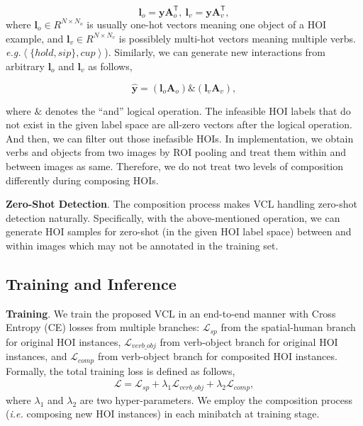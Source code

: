 \documentclass[runningheads]{llncs}
\newcommand{\ie}{\textit{i.e. }}
\newcommand{\eg}{\textit{e.g.}}
\begin{document}
\begin{equation}
\mathbf{l}_o = \mathbf{y} \mathbf{A}_o ^\mathsf{T} , ~ \mathbf{l}_v = \mathbf{y} \mathbf{A}_v ^\mathsf{T} ,
\end{equation}
where $\mathbf{l}_o \in R^{N \times N_o}$ is usually one-hot vectors meaning one object of a HOI example, and $\mathbf{l}_v \in R^{N \times N_v}$ is possiblely multi-hot vectors meaning multiple verbs. \eg $\left \langle \{hold, sip\}, cup \right \rangle$). Similarly, we can generate new interactions from arbitrary $\mathbf{l}_o$ and $\mathbf{l}_v$ as follows,

\begin{equation}
\label{formul:label}
\hat{\mathbf{y}} = (\mathbf{l}_o \mathbf{A}_o) \& (\mathbf{l}_v\mathbf{A}_v),
\end{equation}

where $\&$ denotes the ``and'' logical operation. The infeasible HOI labels that do not exist in the given label space are all-zero vectors after the logical operation. And then, we can filter out those inefasible HOIs. In implementation, we obtain verbs and objects from two images by ROI pooling and treat them within and between images as same. Therefore, we do not treat two levels of composition differently during composing HOIs.


\textbf{Zero-Shot Detection}. The composition process makes VCL handling zero-shot detection naturally. Specifically, with the above-mentioned operation, we can generate HOI samples for zero-shot (in the given HOI label space) between and within images which may not be annotated in the training set.


\subsection{Training and Inference}
\textbf{Training}. We train the proposed VCL in an end-to-end manner with Cross Entropy (CE) losses from multiple branches: $\mathcal{L}_{sp}$ from the spatial-human branch for original HOI instances, $\mathcal{L}_{verb\_obj}$ from verb-object branch for original HOI instances, and $\mathcal{L}_{comp}$ from verb-object branch for composited HOI instances. Formally, the total training loss is defined as follows,
\begin{align}
  \mathcal{L} = \mathcal{L}_{sp} + \lambda_1 \mathcal{L}_{verb\_obj} + \lambda_2 \mathcal{L}_{comp},
\end{align}
where $\lambda_1$ and $\lambda_2$ are two hyper-parameters. We employ the composition process (\ie composing new HOI instances) in each minibatch at training stage.
\end{document}
